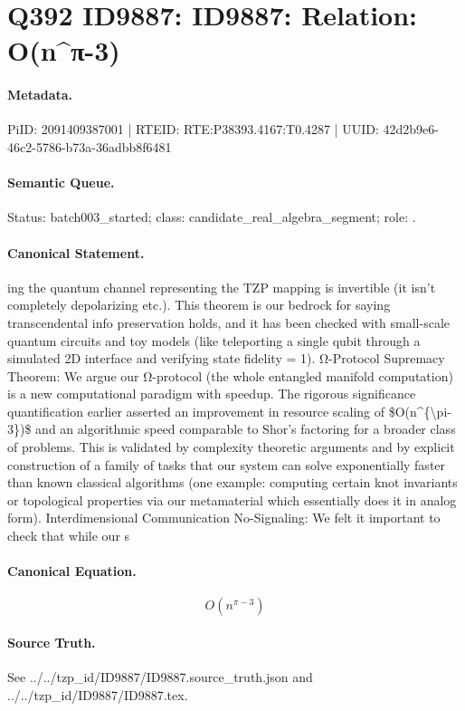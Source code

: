\section*{Q392 ID9887: ID9887: Relation: O(n\textasciicircum{}π-3)}
\paragraph{Metadata.}
PiID: 2091409387001 | RTEID: RTE:P38393.4167:T0.4287 | UUID: 42d2b9e6-46c2-5786-b73a-36adbb8f6481

\paragraph{Semantic Queue.}
Status: batch003\_started; class: candidate\_real\_algebra\_segment; role: .

\paragraph{Canonical Statement.}
ing the quantum channel representing the TZP mapping is invertible (it isn’t completely depolarizing etc.). This theorem is our bedrock for saying transcendental info preservation holds, and it has been checked with small-scale quantum circuits and toy models (like teleporting a single qubit through a simulated 2D interface and verifying state fidelity = 1). Ω-Protocol Supremacy Theorem: We argue our Ω-protocol (the whole entangled manifold computation) is a new computational paradigm with speedup. The rigorous significance quantification earlier asserted an improvement in resource scaling of \$O(n\textasciicircum{}\{\textbackslash{}pi-3\})\$ and an algorithmic speed comparable to Shor’s factoring for a broader class of problems. This is validated by complexity theoretic arguments and by explicit construction of a family of tasks that our system can solve exponentially faster than known classical algorithms (one example: computing certain knot invariants or topological properties via our metamaterial which essentially does it in analog form). Interdimensional Communication No-Signaling: We felt it important to check that while our s

\paragraph{Canonical Equation.}
\[
O(n^{\pi-3})
\]

\paragraph{Source Truth.}
See ../../tzp\_id/ID9887/ID9887.source\_truth.json and ../../tzp\_id/ID9887/ID9887.tex.

